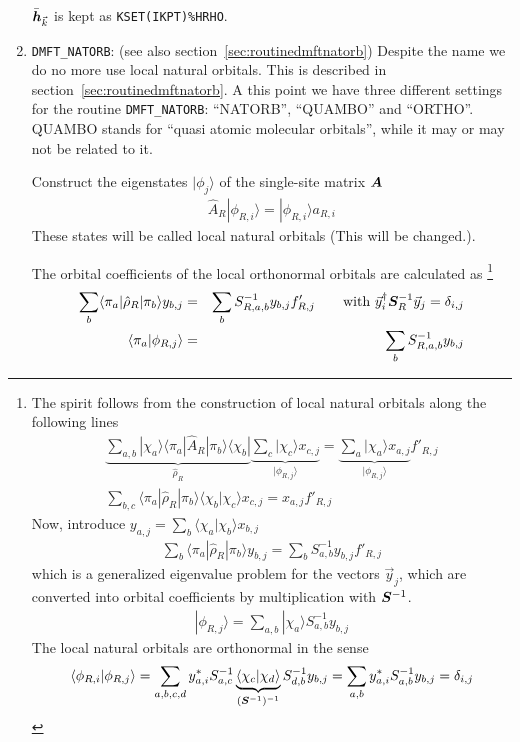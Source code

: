 \documentclass[11pt,a4paper]{report}
\begin{document}
\begin{enumerate}
$\bar{\bm{h}}_{\vec{k}}$ is kept as \verb|KSET(IKPT)%HRHO|.
%
\item \verb|DMFT_NATORB|: (see also
  section~\ref{sec:routinedmftnatorb}) Despite the name we do no more
  use local natural orbitals. This is described in
  section~\ref{sec:routinedmftnatorb}. A this point we have three
  different settings for the routine \verb|DMFT_NATORB|: ``NATORB'',
  ``QUAMBO'' and ``ORTHO''. QUAMBO stands for ``quasi atomic molecular
  orbitals''\cite{qian08_prb78_245112}, while it may or may not be
  related to it.

  Construct the eigenstates $|\phi_j\rangle$ of the single-site
   matrix $\bm{A}$
\begin{eqnarray}
\hat{A}_R|\phi_{R,i}\rangle=|\phi_{R,i}\rangle a_{R,i}
\end{eqnarray}
These states will be called local natural orbitals (This will be
changed.).

The orbital coefficients of the local orthonormal orbitals are
calculated as
\footnote{The spirit follows from the construction of local natural
  orbitals along the following lines
\begin{eqnarray}
\underbrace{\sum_{a,b}|\chi_a\rangle\langle\pi_a|\hat{A}_R|\pi_b\rangle
\langle\chi_b|}_{\hat{\rho}_R}
\underbrace{\sum_c|\chi_c\rangle x_{c,j}}_{|\phi_{R,j}\rangle}
=\underbrace{\sum_a|\chi_a\rangle x_{a,j}}_{|\phi_{R,j}\rangle} f'_{R,j}
\nonumber\\
\sum_{b,c}\langle\pi_a|\hat{\rho}_R|\pi_b\rangle
\langle\chi_b|\chi_c\rangle x_{c,j}
=x_{a,j}f'_{R,j}
\end{eqnarray}
Now, introduce $y_{a,j}=\sum_b\langle\chi_a|\chi_b\rangle x_{b,j}$
\begin{eqnarray}
\sum_{b}\langle\pi_a|\hat{\rho}_R|\pi_b\rangle y_{b,j}
=\sum_b S^{-1}_{a,b}y_{b,j}f'_{R,j}
\end{eqnarray}
which is a generalized eigenvalue problem for the vectors $\vec{y}_j$,
which are converted into orbital coefficients by multiplication with
$\bm{S}^{-1}$.
\begin{eqnarray}
|\phi_{R,j}\rangle=\sum_{a,b}|\chi_a\rangle S^{-1}_{a,b} y_{b,j}
\end{eqnarray}
The local natural orbitals are orthonormal in the sense
\begin{eqnarray}
\langle\phi_{R,i}|\phi_{R,j}\rangle
=\sum_{a,b,c,d}
y^*_{a,i}S^{-1}_{a,c}
\underbrace{\langle\chi_c|\chi_d\rangle}_{(\bm{S}^{-1})^{-1}}
 S^{-1}_{d,b} y_{b,j}
=\sum_{a,b}y^*_{a,i}S^{-1}_{a,b}y_{b,j}=\delta_{i,j}
\end{eqnarray}
}
\begin{eqnarray}
\sum_{b}\langle\pi_a|\hat{\rho}_R|\pi_b\rangle y_{b,j}
&=&\sum_b S^{-1}_{R,a,b}y_{b,j}f'_{R,j}
\qquad\text{with $\vec{y}^\dagger_i \bm{S}^{-1}_R\vec{y}_{j}=\delta_{i,j}$}
\\
\langle\pi_a|\phi_{R,j}\rangle&=&\sum_{b} S^{-1}_{R,a,b} y_{b,j}
\end{eqnarray}


\end{enumerate}
\end{document}
